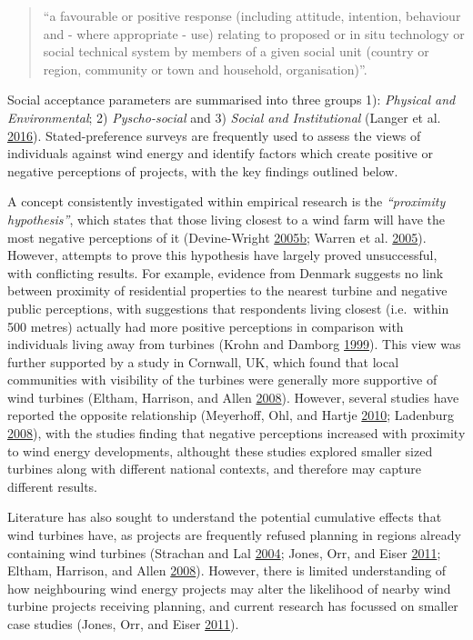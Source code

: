 \documentclass[a4paper,]{article}
\theoremstyle{definition}
\theoremstyle{definition}
\theoremstyle{definition}
\theoremstyle{remark}
\begin{document}
\begin{quote}
``a favourable or positive response (including attitude, intention,
behaviour and - where appropriate - use) relating to proposed or in situ
technology or social technical system by members of a given social unit
(country or region, community or town and household, organisation)''.
\end{quote}

Social acceptance parameters are summarised into three groups 1):
\emph{Physical and Environmental}; 2) \emph{Pyscho-social} and 3)
\emph{Social and Institutional} (Langer et al.
\protect\hyperlink{ref-Langer2016}{2016}). Stated-preference surveys are
frequently used to assess the views of individuals against wind energy
and identify factors which create positive or negative perceptions of
projects, with the key findings outlined below.

A concept consistently investigated within empirical research is the
\emph{``proximity hypothesis''}, which states that those living closest
to a wind farm will have the most negative perceptions of it
(Devine-Wright
\protect\hyperlink{ref-Devine-Wright2005}{2005}\protect\hyperlink{ref-Devine-Wright2005}{b};
Warren et al. \protect\hyperlink{ref-Warren2005}{2005}). However,
attempts to prove this hypothesis have largely proved unsuccessful, with
conflicting results. For example, evidence from Denmark suggests no link
between proximity of residential properties to the nearest turbine and
negative public perceptions, with suggestions that respondents living
closest (i.e.~within 500 metres) actually had more positive perceptions
in comparison with individuals living away from turbines (Krohn and
Damborg \protect\hyperlink{ref-Krohn1999}{1999}). This view was further
supported by a study in Cornwall, UK, which found that local communities
with visibility of the turbines were generally more supportive of wind
turbines (Eltham, Harrison, and Allen
\protect\hyperlink{ref-Eltham2008}{2008}). However, several studies have
reported the opposite relationship (Meyerhoff, Ohl, and Hartje
\protect\hyperlink{ref-Meyerhoff2010}{2010}; Ladenburg
\protect\hyperlink{ref-Ladenburg2008}{2008}), with the studies finding
that negative perceptions increased with proximity to wind energy
developments, althought these studies explored smaller sized turbines
along with different national contexts, and therefore may capture
different results.

Literature has also sought to understand the potential cumulative
effects that wind turbines have, as projects are frequently refused
planning in regions already containing wind turbines (Strachan and Lal
\protect\hyperlink{ref-Strachan2004}{2004}; Jones, Orr, and Eiser
\protect\hyperlink{ref-Jones2011}{2011}; Eltham, Harrison, and Allen
\protect\hyperlink{ref-Eltham2008}{2008}). However, there is limited
understanding of how neighbouring wind energy projects may alter the
likelihood of nearby wind turbine projects receiving planning, and
current research has focussed on smaller case studies (Jones, Orr, and
Eiser \protect\hyperlink{ref-Jones2011}{2011}).
\end{document}

